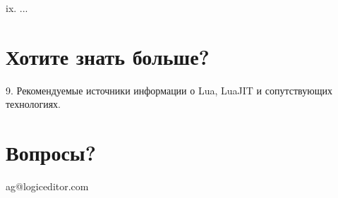 \documentclass[handout]{beamer}
\begin{document}
\begin{frame}
ix. ...
\end{frame}


\section{Хотите знать больше?}

\begin{frame}
9. Рекомендуемые источники информации о Lua, LuaJIT и сопутствующих технологиях.
\end{frame}


\section{Вопросы?}

\begin{frame}

\begin{center}
ag@logiceditor.com
\end{center}

\end{frame}

\end{document}
